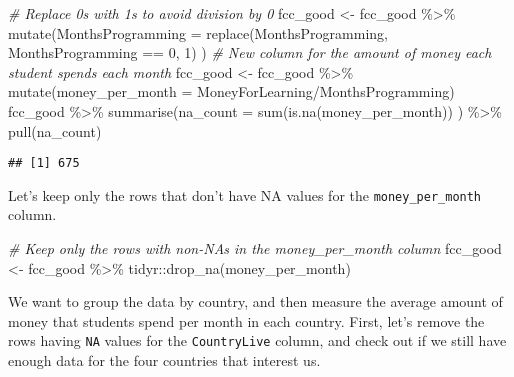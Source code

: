 \documentclass[
]{article}
\newenvironment{Shaded}{\begin{snugshade}}{\end{snugshade}}
\newcommand{\AttributeTok}[1]{\textcolor[rgb]{0.77,0.63,0.00}{#1}}
\newcommand{\CommentTok}[1]{\textcolor[rgb]{0.56,0.35,0.01}{\textit{#1}}}
\newcommand{\DecValTok}[1]{\textcolor[rgb]{0.00,0.00,0.81}{#1}}
\newcommand{\FunctionTok}[1]{\textcolor[rgb]{0.00,0.00,0.00}{#1}}
\newcommand{\NormalTok}[1]{#1}
\newcommand{\OtherTok}[1]{\textcolor[rgb]{0.56,0.35,0.01}{#1}}
\newcommand{\SpecialCharTok}[1]{\textcolor[rgb]{0.00,0.00,0.00}{#1}}
\begin{document}
\begin{Shaded}
\begin{Highlighting}[]
\CommentTok{\# Replace 0s with 1s to avoid division by 0}
\NormalTok{fcc\_good }\OtherTok{\textless{}{-}}\NormalTok{ fcc\_good }\SpecialCharTok{\%\textgreater{}\%}
  \FunctionTok{mutate}\NormalTok{(}\AttributeTok{MonthsProgramming =} \FunctionTok{replace}\NormalTok{(MonthsProgramming,  MonthsProgramming }\SpecialCharTok{==} \DecValTok{0}\NormalTok{, }\DecValTok{1}\NormalTok{) )}
\CommentTok{\# New column for the amount of money each student spends each month}
\NormalTok{fcc\_good }\OtherTok{\textless{}{-}}\NormalTok{ fcc\_good }\SpecialCharTok{\%\textgreater{}\%}
  \FunctionTok{mutate}\NormalTok{(}\AttributeTok{money\_per\_month =}\NormalTok{ MoneyForLearning}\SpecialCharTok{/}\NormalTok{MonthsProgramming) }
\NormalTok{fcc\_good }\SpecialCharTok{\%\textgreater{}\%}
  \FunctionTok{summarise}\NormalTok{(}\AttributeTok{na\_count =} \FunctionTok{sum}\NormalTok{(}\FunctionTok{is.na}\NormalTok{(money\_per\_month)) ) }\SpecialCharTok{\%\textgreater{}\%}
  \FunctionTok{pull}\NormalTok{(na\_count)}
\end{Highlighting}
\end{Shaded}

\begin{verbatim}
## [1] 675
\end{verbatim}

Let's keep only the rows that don't have NA values for the
\texttt{money\_per\_month} column.

\begin{Shaded}
\begin{Highlighting}[]
\CommentTok{\# Keep only the rows with non{-}NAs in the \textasciigrave{}money\_per\_month\textasciigrave{} column }
\NormalTok{fcc\_good  }\OtherTok{\textless{}{-}}\NormalTok{  fcc\_good }\SpecialCharTok{\%\textgreater{}\%}\NormalTok{ tidyr}\SpecialCharTok{::}\FunctionTok{drop\_na}\NormalTok{(money\_per\_month)}
\end{Highlighting}
\end{Shaded}

We want to group the data by country, and then measure the average
amount of money that students spend per month in each country. First,
let's remove the rows having \texttt{NA} values for the
\texttt{CountryLive} column, and check out if we still have enough data
for the four countries that interest us.
\end{document}
